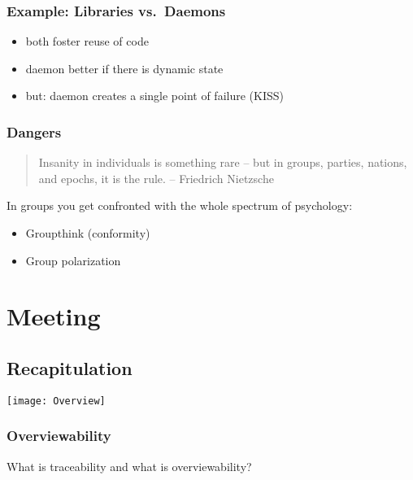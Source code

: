 \begin{frame}
	\frametitle{Example: Libraries vs.\ Daemons}

	\begin{itemize}[<+-| alert@+>]
	\item both foster reuse of code
	\item daemon better if there is dynamic state
	\item but: daemon creates a single point of failure (KISS)
	\end{itemize}
\end{frame}

\begin{frame}
	\frametitle{Dangers}

	\begin{quote}
	Insanity in individuals is something rare -- but in groups, parties, nations, and epochs, it is the rule.
	-- Friedrich Nietzsche
	\end{quote}

	In groups you get confronted with the whole spectrum of psychology:

	\pause

	\begin{itemize}[<+-| alert@+>]
	\item Groupthink (conformity)
	\item Group polarization
	\end{itemize}
\end{frame}



\section{Meeting}

\subsection{Recapitulation}

\begin{frame}
	\texttt{[image: Overview]}
\end{frame}


\begin{assignment}
	\frametitle{Overviewability}

	What is traceability and what is overviewability?
\end{assignment}

